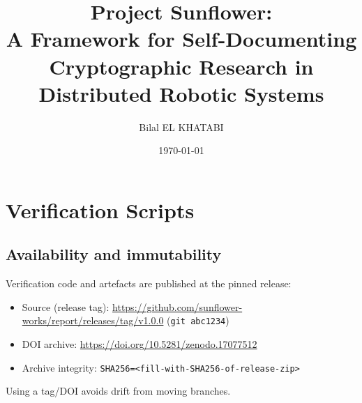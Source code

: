 \documentclass[12pt,a4paper,openright]{book}
\title{Project Sunflower:\\A Framework for Self-Documenting\\Cryptographic Research in Distributed Robotic Systems}
\author{Bilal EL KHATABI\\}
\date{\today}
\begin{document}
    \frontmatter                    %
    \setcounter{tocdepth}{2}

    \maketitle


    \tableofcontents
    \listoffigures
    \listoftables

    \mainmatter                     %


    \backmatter                    %

    \printglossaries               %
    \printbibliography[title={References},notkeyword=online]
    \printbibliography[title={Online Resources},keyword=online]

    \appendix
    
    
    \chapter{Verification Scripts}\label{app:verify}

    \providecommand{\repoURL}{https://github.com/sunflower-works/report}
    \providecommand{\repoTag}{v1.0.0} %
    \providecommand{\repoCommit}{abc1234} %
    \providecommand{\repoDOI}{10.5281/zenodo.17077512} %
    \providecommand{\archiveSHA}{<fill-with-SHA256-of-release-zip>} %

    \section*{Availability and immutability}
    Verification code and artefacts are published at the pinned release:
    \begin{itemize}
      \item Source (release tag): \url{\repoURL/releases/tag/\repoTag} (\texttt{git \repoCommit})
      \item DOI archive: \url{https://doi.org/\repoDOI}
      \item Archive integrity: \texttt{SHA256=\archiveSHA}
    \end{itemize}
    Using a tag/DOI avoids drift from moving branches.
\end{document}
